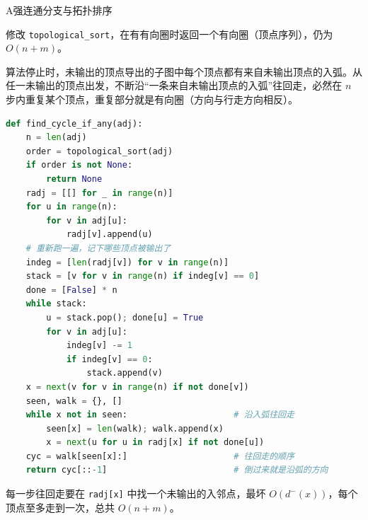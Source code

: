 \begin{exercises}{A}{强连通分支与拓扑排序}
\item\label{ex:digraph-orders:A3} 修改 \texttt{topological\_sort}，在有有向圈时返回一个有向圈（顶点序列），仍为 $O(n+m)$。
\begin{solution}
算法停止时，未输出的顶点导出的子图中每个顶点都有来自未输出顶点的入弧。从任一未输出的顶点出发，不断沿“一条来自未输出顶点的入弧”往回走，必然在 $n$ 步内重复某个顶点，重复部分就是有向圈（方向与行走方向相反）。
\begin{lstlisting}[language=Python]
def find_cycle_if_any(adj):
    n = len(adj)
    order = topological_sort(adj)
    if order is not None:
        return None
    radj = [[] for _ in range(n)]
    for u in range(n):
        for v in adj[u]:
            radj[v].append(u)
    # 重新跑一遍，记下哪些顶点被输出了
    indeg = [len(radj[v]) for v in range(n)]
    stack = [v for v in range(n) if indeg[v] == 0]
    done = [False] * n
    while stack:
        u = stack.pop(); done[u] = True
        for v in adj[u]:
            indeg[v] -= 1
            if indeg[v] == 0:
                stack.append(v)
    x = next(v for v in range(n) if not done[v])
    seen, walk = {}, []
    while x not in seen:                     # 沿入弧往回走
        seen[x] = len(walk); walk.append(x)
        x = next(u for u in radj[x] if not done[u])
    cyc = walk[seen[x]:]                     # 往回走的顺序
    return cyc[::-1]                         # 倒过来就是沿弧的方向
\end{lstlisting}
每一步往回走要在 \texttt{radj[x]} 中找一个未输出的入邻点，最坏 $O(d^-(x))$，每个顶点至多走到一次，总共 $O(n+m)$。
\end{solution}
\end{exercises}
